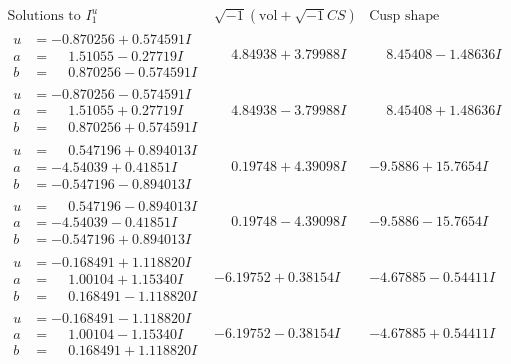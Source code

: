 \documentclass[1p]{elsarticle_modified}
\theoremstyle{definition}
\newcommand{\I}{\sqrt{-1}}
\begin{document}
$$\begin{array}{c|c|c}  
\text{Solutions to }I^u_{1}& \I (\text{vol} + \sqrt{-1}CS) & \text{Cusp shape}\\
 \hline 
\begin{aligned}
u &= -0.870256 + 0.574591 I \\
a &= \phantom{-}1.51055 - 0.27719 I \\
b &= \phantom{-}0.870256 - 0.574591 I\end{aligned}
 & \phantom{-}4.84938 + 3.79988 I & \phantom{-}8.45408 - 1.48636 I \\ \hline\begin{aligned}
u &= -0.870256 - 0.574591 I \\
a &= \phantom{-}1.51055 + 0.27719 I \\
b &= \phantom{-}0.870256 + 0.574591 I\end{aligned}
 & \phantom{-}4.84938 - 3.79988 I & \phantom{-}8.45408 + 1.48636 I \\ \hline\begin{aligned}
u &= \phantom{-}0.547196 + 0.894013 I \\
a &= -4.54039 + 0.41851 I \\
b &= -0.547196 - 0.894013 I\end{aligned}
 & \phantom{-}0.19748 + 4.39098 I & -9.5886 + 15.7654 I \\ \hline\begin{aligned}
u &= \phantom{-}0.547196 - 0.894013 I \\
a &= -4.54039 - 0.41851 I \\
b &= -0.547196 + 0.894013 I\end{aligned}
 & \phantom{-}0.19748 - 4.39098 I & -9.5886 - 15.7654 I \\ \hline\begin{aligned}
u &= -0.168491 + 1.118820 I \\
a &= \phantom{-}1.00104 + 1.15340 I \\
b &= \phantom{-}0.168491 - 1.118820 I\end{aligned}
 & -6.19752 + 0.38154 I & -4.67885 - 0.54411 I \\ \hline\begin{aligned}
u &= -0.168491 - 1.118820 I \\
a &= \phantom{-}1.00104 - 1.15340 I \\
b &= \phantom{-}0.168491 + 1.118820 I\end{aligned}
 & -6.19752 - 0.38154 I & -4.67885 + 0.54411 I \\ \hline\begin{aligned}

\end{aligned}
\end{array}$$
\end{document}

